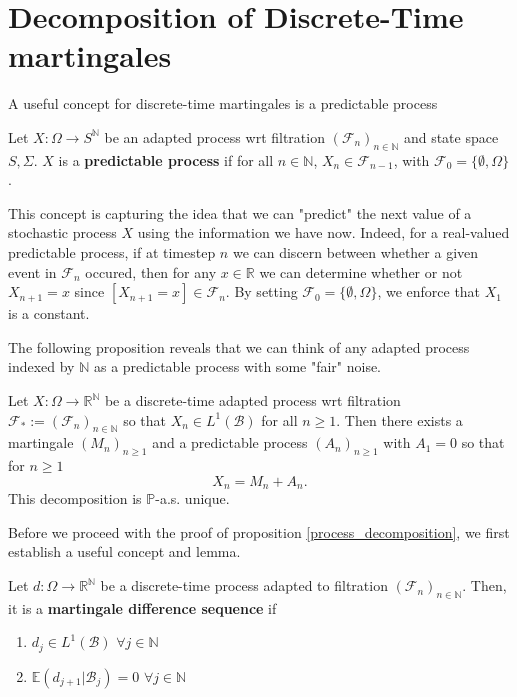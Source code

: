 \section{Decomposition of Discrete-Time martingales}

A useful concept for discrete-time martingales is a predictable process

\begin{definition}
    Let $X: \Omega \to S^{\mathbb{N}}$ be an adapted process wrt filtration $(\mathcal{F}_{n})_{n \in \mathbb{N}}$ and state space \(S, \Sigma\). \(X\) is a \textbf{predictable process} if for all \(n \in \mathbb{N}\), \(X_{n} \in \mathcal{F}_{n-1}\), with \(\mathcal{F}_{0} = \{\emptyset, \Omega\}\).
\end{definition}

This concept is capturing the idea that we can "predict" the next value of a stochastic process \(X\) using the information we have now. Indeed, for a real-valued predictable process, if at timestep \(n\) we can discern between whether a given event in \(\mathcal{F}_{n}\) occured, then for any \(x \in \mathbb{R}\) we can determine whether or not \(X_{n+1} = x\) since \([X_{n+1}=x] \in \mathcal{F}_{n}\). By setting \(\mathcal{F}_{0} = \{\emptyset, \Omega\}\), we enforce that \(X_{1}\) is a constant.

The following proposition reveals that we can think of any adapted process indexed by \(\mathbb{N}\) as a predictable process with some "fair" noise.

\begin{proposition}
    \label{process_decomposition}
    Let $X: \Omega \to \mathbb{R}^{\mathbb{N}}$ be a discrete-time adapted process wrt filtration $\mathcal{F}_{*} := (\mathcal{F}_{n})_{n \in \mathbb{N}}$ so that \(X_{n} \in L^{1}(\mathcal{B})\) for all \(n \geq 1\). Then there exists a martingale \((M_{n})_{n \geq 1}\) and a predictable process \((A_{n})_{n \geq 1}\) with \(A_{1} = 0\) so that for \(n \geq 1\)
    \[X_{n} = M_{n} + A_{n}.\]
    This decomposition is \(\mathbb{P}\)-a.s. unique.
\end{proposition}

Before we proceed with the proof of proposition \ref{process_decomposition}, we first establish a useful concept and lemma.

\begin{definition}
    \label{difference_defn}
    Let $d: \Omega \to \mathbb{R}^{\mathbb{N}}$ be a discrete-time process adapted to filtration $(\mathcal{F}_{n})_{n \in \mathbb{N}}$. Then, it is a \textbf{martingale difference sequence} if
    \begin{enumerate}
        \item $d_{j} \in L^{1}(\mathcal{B})$ $\forall j \in \mathbb{N}$
        \item $\mathbb{E}(d_{j+1} | \mathcal{B}_{j}) = 0$ \(\forall j \in \mathbb{N}\)
    \end{enumerate}
\end{definition}

